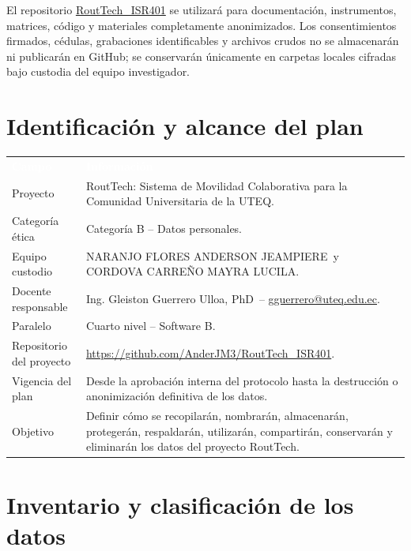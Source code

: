 \documentclass[10pt,a4paper]{article}
\makeatletter
\newcommand{\Proyecto}{RoutTech: Sistema de Movilidad Colaborativa para la Comunidad Universitaria de la UTEQ}
\newcommand{\CategoriaEtica}{Categoría B -- Datos personales}
\newcommand{\Repositorio}{https://github.com/AnderJM3/RoutTech_ISR401}
\newcommand{\Paralelo}{Cuarto nivel -- Software B}
\newcommand{\Docente}{Ing. Gleiston Guerrero Ulloa, PhD}
\newcommand{\CorreoDocente}{gguerrero@uteq.edu.ec}
\newcommand{\Anderson}{NARANJO FLORES ANDERSON JEAMPIERE}
\newcommand{\Mayra}{CORDOVA CARREÑO MAYRA LUCILA}
\makeatother
\begin{document}
\begin{WarningBox}
El repositorio \href{\Repositorio}{RoutTech\_ISR401} se utilizará para documentación, instrumentos, matrices, código y materiales completamente anonimizados. Los consentimientos firmados, cédulas, grabaciones identificables y archivos crudos no se almacenarán ni publicarán en GitHub; se conservarán únicamente en carpetas locales cifradas bajo custodia del equipo investigador.
\end{WarningBox}

\section{Identificación y alcance del plan}

\noindent\begin{tabularx}{\textwidth}{@{}L{4.45cm} J@{}}
\textcolor{white}{\textbf{Campo}} & \textcolor{white}{\textbf{Información}}\\
Proyecto & \Proyecto.\\
Categoría ética & \CategoriaEtica.\\
Equipo custodio & \Anderson\ y \Mayra.\\
Docente responsable & \Docente\ -- \href{mailto:\CorreoDocente}{\CorreoDocente}.\\
Paralelo & \Paralelo.\\
Repositorio del proyecto & \url{\Repositorio}.\\
Vigencia del plan & Desde la aprobación interna del protocolo hasta la destrucción o anonimización definitiva de los datos.\\
Objetivo & Definir cómo se recopilarán, nombrarán, almacenarán, protegerán, respaldarán, utilizarán, compartirán, conservarán y eliminarán los datos del proyecto RoutTech.\\
\end{tabularx}

\section{Inventario y clasificación de los datos}
\end{document}
